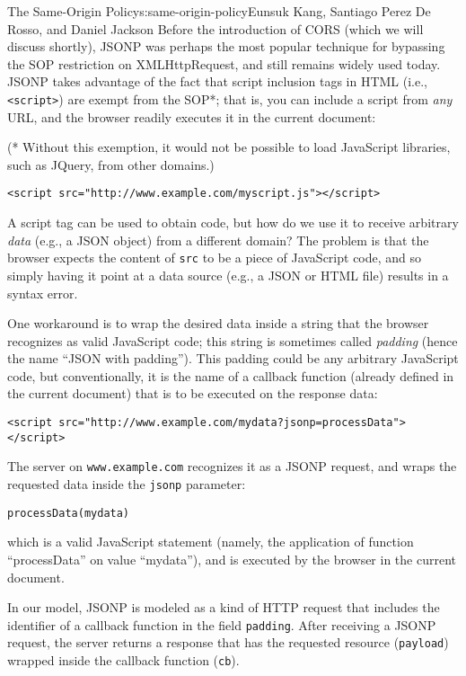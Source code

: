 \begin{aosachapter}{The Same-Origin Policy}{s:same-origin-policy}{Eunsuk Kang, Santiago Perez De Rosso, and Daniel Jackson}
Before the introduction of CORS (which we will discuss shortly), JSONP
was perhaps the most popular technique for bypassing the SOP restriction
on XMLHttpRequest, and still remains widely used today. JSONP takes
advantage of the fact that script inclusion tags in HTML (i.e.,
\texttt{\textless{}script\textgreater{}}) are exempt from the SOP*; that
is, you can include a script from \emph{any} URL, and the browser
readily executes it in the current document:

(* Without this exemption, it would not be possible to load JavaScript
libraries, such as JQuery, from other domains.)

\begin{verbatim}
<script src="http://www.example.com/myscript.js"></script>
\end{verbatim}

A script tag can be used to obtain code, but how do we use it to receive
arbitrary \emph{data} (e.g., a JSON object) from a different domain? The
problem is that the browser expects the content of \texttt{src} to be a
piece of JavaScript code, and so simply having it point at a data source
(e.g., a JSON or HTML file) results in a syntax error.

One workaround is to wrap the desired data inside a string that the
browser recognizes as valid JavaScript code; this string is sometimes
called \emph{padding} (hence the name ``JSON with padding''). This
padding could be any arbitrary JavaScript code, but conventionally, it
is the name of a callback function (already defined in the current
document) that is to be executed on the response data:

\begin{verbatim}
<script src="http://www.example.com/mydata?jsonp=processData"></script>
\end{verbatim}

The server on \texttt{www.example.com} recognizes it as a JSONP request,
and wraps the requested data inside the \texttt{jsonp} parameter:

\begin{verbatim}
processData(mydata)
\end{verbatim}

which is a valid JavaScript statement (namely, the application of
function ``processData'' on value ``mydata''), and is executed by the
browser in the current document.

In our model, JSONP is modeled as a kind of HTTP request that includes
the identifier of a callback function in the field \texttt{padding}.
After receiving a JSONP request, the server returns a response that has
the requested resource (\texttt{payload}) wrapped inside the callback
function (\texttt{cb}).


\end{aosachapter}
